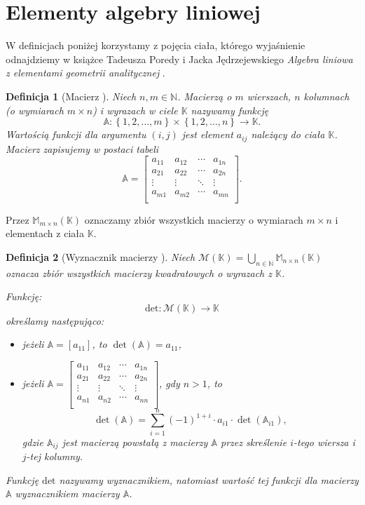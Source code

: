 \documentclass[12pt,a4paper]{report}
\newtheorem{df}{Definicja}[chapter]
\newcommand{\set}[1]{\left\lbrace {#1} \right\rbrace}
\newcommand{\setK}{\mathbb{K}}
\newcommand{\setN}{\mathbb{N}}
\newcommand{\wyznacznik}[1]{\operatorname{det}\left({#1} \right)}
\begin{document}
\section{Elementy algebry liniowej}

W definicjach poniżej korzystamy z pojęcia ciała, którego wyjaśnienie odnajdziemy w książce Tadeusza Poredy i Jacka Jędrzejewskiego \textit{Algebra liniowa z elementami geometrii analitycznej} {\citep[Sec 4.4]{alzega}}.

\begin{df}[Macierz {\citep[Sec 8.1 Def. 8.1]{alzega}}]
Niech $n,m \in \setN$. Macierzą o $m$ wierszach, $n$ kolumnach (o wymiarach $m \times n$) i wyrazach w ciele $\setK$ nazywamy funkcję 
$$
\mathbb{A}: \set{1,2, \ldots ,m}\times \set{1,2, \ldots ,n} \to \setK.
$$
Wartością funkcji dla argumentu $(i,j)$ jest element $a_{ij}$  należący do ciała $\setK$. Macierz zapisujemy w postaci tabeli
$$
\mathbb{A} = \left[
        \begin{array}{cccc}
         a_{11} & a_{12} & \cdots & a_{1n} \\
         a_{21} & a_{22} & \cdots & a_{2n} \\
         \vdots & \vdots & \ddots & \vdots \\
         a_{m1} & a_{m2} & \cdots & a_{mn} \\
         \end{array}
      \right].
$$
\end{df}
\bigskip
Przez $\mathbb{M}_{m \times n}(\setK)$ oznaczamy zbiór wszystkich macierzy o wymiarach $m \times n$ i elementach z ciała $\setK$.

\begin{df}[Wyznacznik macierzy {\citep[Sec 10.1, Def. 10.1]{alzega}}]
Niech $\mathcal{M}(\setK)=\bigcup_{n\in \setN} \mathbb{M}_{n \times n}(\setK)$ oznacza zbiór wszystkich macierzy kwadratowych o wyrazach z $\setK$.

Funkcję:
$$
\mathrm{det} : \mathcal{M}(\setK) \to \setK
$$ 
określamy następująco:
\begin{itemize}
\item jeżeli $\mathbb{A}=[a_{11}]$, to $\wyznacznik{\mathbb{A}}=a_{11}$,
\item jeżeli $\mathbb{A} = \left[
        \begin{array}{cccc}
         a_{11} & a_{12} & \cdots & a_{1n} \\
         a_{21} & a_{22} & \cdots & a_{2n} \\
         \vdots & \vdots & \ddots & \vdots \\
         a_{n1} & a_{n2} & \cdots & a_{nn} \\
         \end{array}
      \right]$, gdy $n>1$, to
$$
\wyznacznik{\mathbb{A}} = \sum_{i=1}^n (-1)^{1+i} \cdot a_{i1} \cdot \wyznacznik{\mathbb{A}_{i1}},
$$
gdzie 
$\mathbb{A}_{ij}$ jest macierzą powstałą z macierzy $\mathbb{A}$ przez skreślenie $i$-tego wiersza i $j$-tej kolumny.
\end{itemize}
Funkcję $\mathrm{det}$ nazywamy wyznacznikiem, natomiast wartość tej funkcji dla macierzy $\mathbb{A}$ wyznacznikiem macierzy $\mathbb{A}$.
\end{df}
\end{document}
